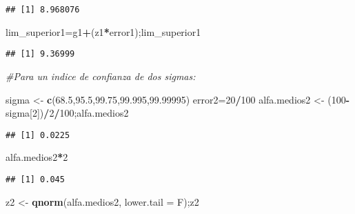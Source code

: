 \documentclass[
]{article}
\newenvironment{Shaded}{\begin{snugshade}}{\end{snugshade}}
\newcommand{\AttributeTok}[1]{\textcolor[rgb]{0.13,0.29,0.53}{#1}}
\newcommand{\CommentTok}[1]{\textcolor[rgb]{0.56,0.35,0.01}{\textit{#1}}}
\newcommand{\DecValTok}[1]{\textcolor[rgb]{0.00,0.00,0.81}{#1}}
\newcommand{\FloatTok}[1]{\textcolor[rgb]{0.00,0.00,0.81}{#1}}
\newcommand{\FunctionTok}[1]{\textcolor[rgb]{0.13,0.29,0.53}{\textbf{#1}}}
\newcommand{\NormalTok}[1]{#1}
\newcommand{\OtherTok}[1]{\textcolor[rgb]{0.56,0.35,0.01}{#1}}
\newcommand{\SpecialCharTok}[1]{\textcolor[rgb]{0.81,0.36,0.00}{\textbf{#1}}}
\begin{document}
\begin{verbatim}
## [1] 8.968076
\end{verbatim}

\begin{Shaded}
\begin{Highlighting}[]
\NormalTok{lim\_superior1}\OtherTok{=}\NormalTok{g1}\SpecialCharTok{+}\NormalTok{(z1}\SpecialCharTok{*}\NormalTok{error1);lim\_superior1}
\end{Highlighting}
\end{Shaded}

\begin{verbatim}
## [1] 9.36999
\end{verbatim}

\begin{Shaded}
\begin{Highlighting}[]
\CommentTok{\#Para un indice de confianza de dos sigmas:}

\NormalTok{sigma }\OtherTok{\textless{}{-}} \FunctionTok{c}\NormalTok{(}\FloatTok{68.5}\NormalTok{,}\FloatTok{95.5}\NormalTok{,}\FloatTok{99.75}\NormalTok{,}\FloatTok{99.995}\NormalTok{,}\FloatTok{99.99995}\NormalTok{)}
\NormalTok{error2}\OtherTok{=}\DecValTok{20}\SpecialCharTok{/}\DecValTok{100}
\NormalTok{alfa.medios2 }\OtherTok{\textless{}{-}}\NormalTok{ (}\DecValTok{100}\SpecialCharTok{{-}}\NormalTok{sigma[}\DecValTok{2}\NormalTok{])}\SpecialCharTok{/}\DecValTok{2}\SpecialCharTok{/}\DecValTok{100}\NormalTok{;alfa.medios2}
\end{Highlighting}
\end{Shaded}

\begin{verbatim}
## [1] 0.0225
\end{verbatim}

\begin{Shaded}
\begin{Highlighting}[]
\NormalTok{alfa.medios2}\SpecialCharTok{*}\DecValTok{2}
\end{Highlighting}
\end{Shaded}

\begin{verbatim}
## [1] 0.045
\end{verbatim}

\begin{Shaded}
\begin{Highlighting}[]
\NormalTok{z2 }\OtherTok{\textless{}{-}} \FunctionTok{qnorm}\NormalTok{(alfa.medios2, }\AttributeTok{lower.tail =}\NormalTok{ F);z2}
\end{Highlighting}
\end{Shaded}
\end{document}
